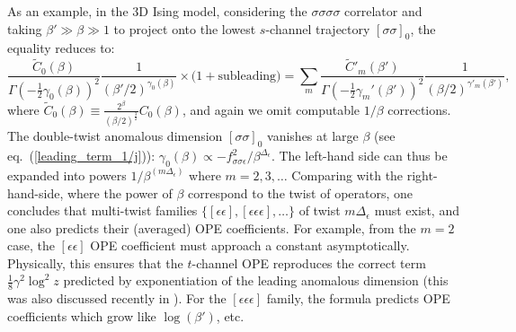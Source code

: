 \documentclass[11pt, reqno,preprint]{article}
\def\be{\begin{equation}}
\def\ee{\end{equation}}
\begin{document}
As an example, in the 3D Ising model, considering the $\sigma\sigma\sigma\sigma$ correlator
and taking $\beta'\gg \beta\gg 1$ to project onto the lowest  $s$-channel trajectory $[\sigma\sigma]_0$,
the equality reduces to:
\be
\frac{\tilde{C}_0(\beta)}{\Gamma(-\tfrac12\gamma_0(\beta))^2}\frac{1}{(\beta'/2)^{\gamma_0(\beta)}}
\times\Big(1+\mbox{subleading}\Big)
=
\sum_{m} \frac{\tilde{C}'_m(\beta')}{\Gamma(-\tfrac12\gamma_m'(\beta'))^2}\frac{1}{(\beta/2)^{\gamma'_m(\beta')}},
\ee
where $\tilde{C}_0(\beta)\equiv \frac{2^\beta}{(\beta/2)^{\frac32}}C_0(\beta)$, and again we omit computable $1/\beta$ corrections.  The double-twist anomalous dimension $[\sigma\sigma]_0$ vanishes at large $\beta$ (see eq.~(\ref{leading_term_1/j})):
$\gamma_0(\beta)\propto -f_{\sigma\sigma\epsilon}^2/\beta^{\Delta_\epsilon}$.
The left-hand side can thus be expanded into powers $1/\beta^{(m\Delta_\epsilon)}$ where $m=2,3,\ldots$
Comparing with the right-hand-side, where the power of $\beta$ correspond to the twist of operators,
one concludes that multi-twist families $\{[\epsilon\epsilon],[\epsilon\epsilon\epsilon],\ldots\}$ of twist $m\Delta_{\epsilon}$
must exist, and one also predicts their (averaged) OPE coefficients.
For example, from the $m=2$ case,
the $[\epsilon\epsilon]$ OPE coefficient must approach a constant asymptotically.  Physically, this
ensures that the $t$-channel OPE reproduces the correct term $\tfrac18\gamma^2\log^2z$ predicted by exponentiation
of the leading anomalous dimension (this was also discussed recently in \cite{Simmons-Duffin:2016wlq}). 
For the $[\epsilon\epsilon\epsilon]$ family, the formula predicts OPE coefficients which grow like $\log(\beta')$, etc.  
\end{document}
